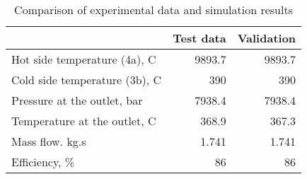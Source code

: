 \begin{table}
\label{tab:Comparison}
\caption{Comparison of experimental data and simulation results}
\begin{center}
\begin{tabulary}{0.9\textwidth}{LRR}
\toprule
& Test data \cite{Iverson_2013}  & Validation \\
\midrule
Hot side temperature (4a), C & 9893.7 & 9893.7 \\
Cold side temperature (3b), C & 390 & 390 \\
Pressure at the outlet, bar & 7938.4 & 7938.4 \\
Temperature at the outlet, C & 368.9 & 367.3 \\
Mass flow. kg.s & 1.741 & 1.741 \\
Efficiency, \% & 86 & 86 \\
\bottomrule
\end{tabulary}
\end{center}
\end{table}